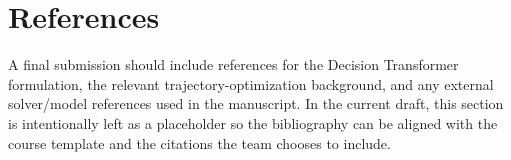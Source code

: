 \section{References}

A final submission should include references for the Decision Transformer formulation, the relevant trajectory-optimization background, and any external solver/model references used in the manuscript. In the current draft, this section is intentionally left as a placeholder so the bibliography can be aligned with the course template and the citations the team chooses to include.
